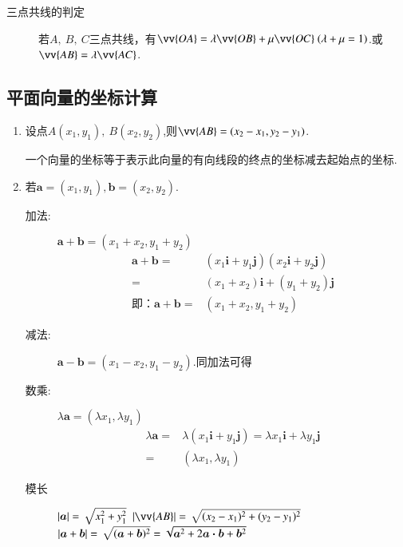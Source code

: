 \documentclass{BHCexam}
\begin{document}
\begin{description}
\item[三点共线的判定] 若$ A,~B,~C $三点共线，有$ \vv{OA}=\lambda \vv{OB}+\mu\vv{OC}~(\lambda+\mu=1) $.或$\vv{AB}=\lambda \vv{AC}$.
%
\end{description}
\subsection{平面向量的坐标计算}
\begin{enumerate}
\item  设点$ A(x_1,y_1),~B(x_2,y_2) $,则$ \vv{AB}=(x_2-x_1,y_2-y_1) $.\par 
一个向量的坐标等于表示此向量的有向线段的终点的坐标减去起始点的坐标.
\item 若$\bm{a}=\left(x_1,y_1\right),\bm{b}=\left(x_2,y_2\right)$.
\begin{description}
\item[加法:] $\bm{a}+\bm{b}=(x_1+x_2,y_1+y_2)$
\begin{equation*}
\begin{aligned}
\bm{a}+\bm{b}=&\left(x_1\bm{i}+y_1\bm{j}\right)\left(x_2\bm{i}+y_2\bm{j}\right)\\
=&\left(x_1+x_2\right)\bm{i}+\left(y_1+y_2\right)\bm{j}\\
\text{即：}\bm{a}+\bm{b}=&(x_1+x_2,y_1+y_2)
\end{aligned}
\end{equation*}
\item[减法:] $\bm{a}-\bm{b}=\left(x_1-x_2,y_1-y_2\right)$.同加法可得
\item[数乘:] $ \lambda \bm{a}=\left(\lambda x_1,\lambda y_1\right) $\begin{equation*}
\begin{aligned}
 \lambda \bm{a} =&\lambda\left(x_1\bm{i}+y_1\bm{j}\right)=\lambda x_1\bm{i}+\lambda y_1\bm{j}\\
=&\left(\lambda x_1,\lambda y_1\right)
\end{aligned}
\end{equation*}

\item[模长]
 $\left| \bm{a} \right|=\sqrt{x_1^2+y_1^2}$\qquad
 $\abs{\vv{AB}}=\sqrt{(x_2-x_1)^2+(y_2-y_1)^2}$\\
\qquad $\left| \bm{a}+\bm{b} \right|=\sqrt{(\bm{a}+\bm{b})^2}=\sqrt{\bm{a}^2+2\bm{a}\bm{\cdot}\bm{b}+\bm{b}^2}$\\


\end{description}
\end{enumerate}
\end{document}
